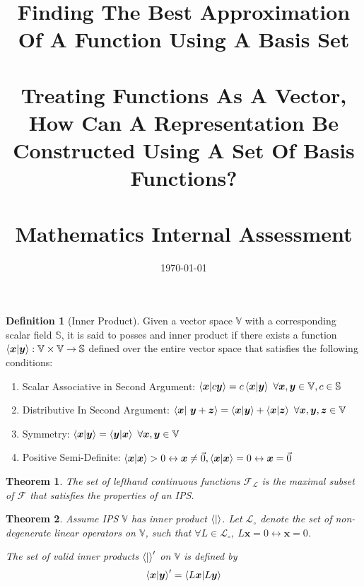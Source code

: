 \documentclass{article}
\title{
  {\LARGE
   \textbf{Finding The Best Approximation Of A Function Using A Basis Set}
   }\\~\\
   {\large
    Treating Functions As A Vector, How Can A Representation Be Constructed Using A Set Of Basis Functions?
   }\\~\\
  {\large Mathematics Internal Assessment}\\
}
\date{\today}
\newcommand{\B}[1]{\boldsymbol{#1}}
\newtheorem{theorem}{Theorem}[section]
\theoremstyle{definition}
\newtheorem{definition}{Definition}[section]
\theoremstyle{remark}
\begin{document}
\maketitle
\pagebreak


\tableofcontents
\pagebreak


\begin{definition}[Inner Product]
  Given a vector space $\mathbb{V}$ with a corresponding scalar field $\mathbb{S}$, it is said to posses and inner product if there exists
  a function $\braket{\B{x}| \B{y}} : \mathbb{V} \times \mathbb{V} \to \mathbb{S}$ defined over the entire vector space that satisfies the following conditions:
  \cite{AdvancedCalculus}
  \begin{enumerate}
    \item Scalar Associative in Second Argument: $\braket{\B{x}|c\B{y}} = c\braket{\B{x}| \B{y}} ~ \forall \B{x}, \B{y} \in \mathbb{V}, c \in \mathbb{S}$
    \item Distributive In Second Argument: $\braket{\B{x}| ~ \B{y} + \B{z}} = \braket{\B{x}| \B{y}} + \braket{\B{x}|\B{z}}  ~ \forall \B{x}, \B{y}, \B{z} \in \mathbb{V}$
    \item Symmetry: $\braket{\B{x}| \B{y}} = \braket{\B{y}|\B{x}} ~ \forall \B{x}, \B{y} \in \mathbb{V}$
    \item Positive Semi-Definite: $\braket{\B{x}| \B{x}} > 0 \leftrightarrow \B{x} \neq \vec{0}, \braket{\B{x}| \B{x}} = 0 \leftrightarrow \B{x} = \vec{0}$
  \end{enumerate}
  \label{def:InnerProduct}
\end{definition}

\begin{theorem}
  The set of lefthand continuous functions $\mathscr{F}_{\mathcal{L}}$ is the
  maximal subset of $\mathscr{F}$ that satisfies the properties of an IPS.
\end{theorem}



\begin{theorem}
  Assume IPS $\mathbb{V}$ has inner product $\braket{|}$. Let $\mathcal{L}_{\circ}$ denote the 
  set of non-degenerate linear operators on $\mathbb{V}$, such that $\forall L \in \mathcal{L}_\circ, ~ L \B{x} = 0 \leftrightarrow \B{x} = 0$.

  The set of valid inner products $\braket{|}^\prime$ on $\mathbb{V}$ is defined by
  \begin{equation}
    \braket{\B{x}|\B{y}}^\prime = \braket{ L \B{x} | L \B{y}}
  \end{equation}
\end{theorem}
\end{document}
